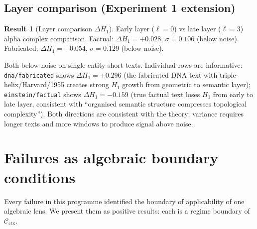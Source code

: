 \documentclass[11pt]{amsart}
\theoremstyle{definition}
\newtheorem{result}[theorem]{Result}
\newcommand{\Cctx}{\mathcal{C}_{\!\mathrm{ctx}}}
\begin{document}
\subsection{Layer comparison (Experiment 1 extension)}

\begin{result}[Layer comparison $\Delta H_1$]
Early layer ($\ell=0$) vs late layer ($\ell=3$) alpha complex comparison.
Factual: $\overline{\Delta H_1} = +0.028$, $\sigma = 0.106$ (below noise).
Fabricated: $\overline{\Delta H_1} = +0.054$, $\sigma = 0.129$ (below noise).

Both below noise on single-entity short texts.
Individual rows are informative:
\texttt{dna/fabricated} shows $\Delta H_1 = +0.296$ (the fabricated DNA text
with triple-helix/Harvard/1955 creates strong $H_1$ growth from geometric
to semantic layer); \texttt{einstein/factual} shows $\Delta H_1 = -0.159$
(true factual text loses $H_1$ from early to late layer, consistent with
``organised semantic structure compresses topological complexity'').
Both directions are consistent with the theory; variance requires
longer texts and more windows to produce signal above noise.
\end{result}

\section{Failures as algebraic boundary conditions}
\label{sec:failures}

Every failure in this programme identified the boundary of applicability
of one algebraic lens.
We present them as positive results: each is a regime boundary of $\Cctx$.
\end{document}
